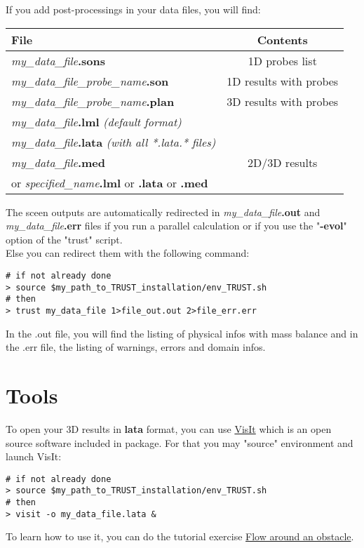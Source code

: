 If you add post-processings in your data files, you will find:

\begin{longtable}{|l|c|}
\hline \textbf{File}                                    & \textbf{Contents} \\ \hline \hline
\textit{my\_data\_file}\textbf{.sons}                          & 1D probes list \\ \hline
\textit{my\_data\_file\_probe\_name}\textbf{.son}              & 1D results with probes \\ \hline
\textit{my\_data\_file\_probe\_name}\textbf{.plan}             & 3D results with probes\\ \hline
\textit{my\_data\_file}\textbf{.lml} \textit{(default format)}             & \\
\textit{my\_data\_file}\textbf{.lata} \textit{(with all *.lata.* files)}   & \\
\textit{my\_data\_file}\textbf{.med}                                       & 2D/3D results \\
or \textit{specified\_name}\textbf{.lml} or \textbf{.lata} or \textbf{.med}  & \\ \hline
\end{longtable}

The sceen outputs are automatically redirected in \textit{my\_data\_file}\textbf{.out} and \textit{my\_data\_file}\textbf{.err} files if you run a parallel calculation or if you use the "\textbf{-evol}" option of the "trust" script.\\
Else you can redirect them with the following command:
\begin{verbatim}
# if not already done
> source $my_path_to_TRUST_installation/env_TRUST.sh
# then
> trust my_data_file 1>file_out.out 2>file_err.err
\end{verbatim}

In the .out file, you will find the listing of physical infos with mass balance and in the .err file, the listing of warnings, errors and domain infos.




\section{Tools}

To open your 3D results in \textbf{lata} format, you can use \href{https://wci.llnl.gov/simulation/computer-codes/visit}{VisIt} which is an open source software included in \trust package. For that you may "source" \trust environment and launch VisIt:
\begin{verbatim}
# if not already done
> source $my_path_to_TRUST_installation/env_TRUST.sh
# then
> visit -o my_data_file.lata &
\end{verbatim}
To learn how to use it, you can do the \trust tutorial exercise \href{TRUST_tutorial.pdf\#exo1}{Flow around an obstacle}. \\

